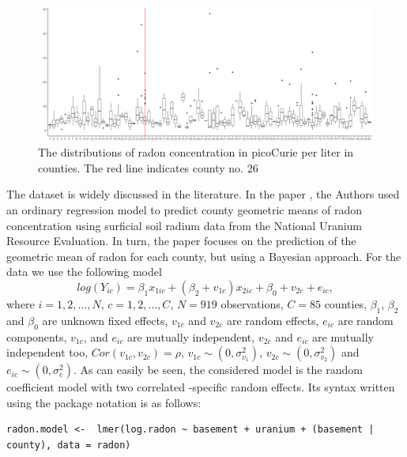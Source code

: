 \begin{figure}[h]
\centering
\includegraphics[scale=0.55]{boxAll.png}
\caption{The distributions of radon concentration in picoCurie per liter in counties. The red line indicates county no. 26}\label{boxplot}
\end{figure}
The  dataset is widely discussed in the literature. In the paper \cite{nero1994statistically}, the Authors used an ordinary regression model to predict county geometric means of radon concentration using surficial soil radium data from the National Uranium Resource Evaluation. In turn, the paper \cite{price1996bayesian} focuses on the prediction of the geometric mean of radon for each county, but using a Bayesian approach. For the   data we use the following model
\begin{equation}\label{radon.model}
    log(Y_{ic}) = \beta_1 x_{1ic} + (\beta_2 + v_{1c}) x_{2ic} + \beta_0 + v_{2c} + e_{ic},
\end{equation}
where $i=1,2,\dots,N$, $c=1,2,\dots, C$, $N = 919$ observations, $C = 85$ counties, $\beta_1$, $\beta_2$ and $\beta_0$ are unknown fixed effects, $v_{1c}$ and $v_{2c}$ are random effects, $e_{ic}$ are random components, $v_{1c}$, and $e_{ic}$ are mutually independent, $v_{2c}$ and $e_{ic}$ are mutually independent too, $Cor(v_{1c}, v_{2c}) = \rho$, $v_{1c} \sim (0, \sigma^2_{v_1})$, $v_{2c} \sim (0, \sigma^2_{v_2})$  and $e_{ic} \sim (0, \sigma^2_e)$. As can easily be seen, the considered model is the random coefficient model with two correlated -specific random effects. Its syntax written using the package  notation is as follows:
\begin{verbatim}
radon.model <-	lmer(log.radon ~ basement + uranium + (basement | county), data = radon)
\end{verbatim}
